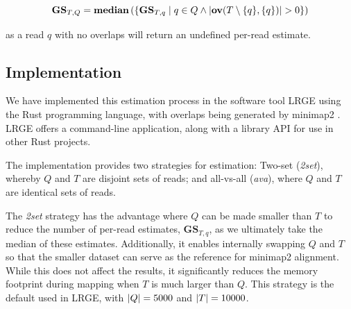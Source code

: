 \documentclass[unnumsec,webpdf,modern,large]{oup-authoring-template}
\theoremstyle{thmstyleone}%
\theoremstyle{thmstyletwo}%
\theoremstyle{thmstylethree}%
\newcommand{\overl}[2]{\mathbf{ov}(#1, #2)}
\newcommand{\overbar}[1]{\mkern 1.5mu\overline{\mkern-1.5mu#1\mkern-1.5mu}\mkern 1.5mu}
\DeclarePairedDelimiter\size{\lvert}{\rvert}
\newcommand{\avglen}[1]{\mathbf{\overbar{\text{$#1$}}}}
\newcommand{\gs}{\textbf{GS}}
\newcommand{\ot}{\textbf{OT}}
\newcommand{\lrge}{LRGE}
\newcommand{\ava}{\textit{ava}}
\newcommand{\twoset}{\textit{2set}}
\newcommand{\newversion}[1]{\textcolor{blue}{#1}}
\begin{document}
\newversion{
\begin{equation}
    \gs_{T,Q} = \textbf{\text{median}}\left( \{ \gs_{T, q} \mid q \in Q  \wedge \size{\overl{T \setminus \{q\}}{\{q\}}} >0   \} \right)
\end{equation}
}


as a read $q$ with no overlaps will return an undefined per-read estimate.




\subsection{Implementation}

We have implemented this estimation process in the software tool \lrge{} using the Rust programming language, with overlaps being generated by minimap2 \citep{li_minimap2_2018}. \lrge{} offers a command-line application, along with a library API for use in other Rust projects.

The implementation provides two strategies for estimation: Two-set (\twoset{}), whereby $Q$ and $T$ are disjoint sets of reads; and all-vs-all (\ava{}), where $Q$ and $T$ are identical sets of reads.

The \twoset{} strategy has the advantage where $Q$ can be made smaller than $T$ to reduce the number of per-read estimates, $\gs_{T,q}$, as we ultimately take the median of these estimates. Additionally, it enables internally swapping $Q$ and $T$ so that the smaller dataset can serve as the reference for minimap2 alignment. While this does not affect the results, it significantly reduces the memory footprint during mapping when $T$ is much larger than $Q$. This strategy is the default used in \lrge{}, with $\size{Q} = 5000$ and $\size{T} = 10000$.
\end{document}
